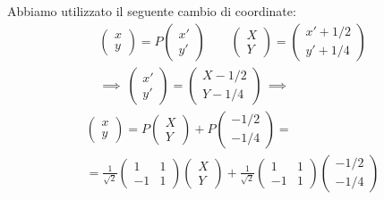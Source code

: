 
Abbiamo utilizzato il seguente cambio di coordinate: %
\begin{gather*}
    \begin{pmatrix}
        x\\y
    \end{pmatrix}=P\begin{pmatrix}
        x'\\y'
    \end{pmatrix}\qquad \begin{pmatrix}
        X\\Y
    \end{pmatrix}=\begin{pmatrix}
        x'+1/2\\ y'+1/4
    \end{pmatrix}\\
    \implies\:\begin{pmatrix}
        x'\\y'
    \end{pmatrix}=\begin{pmatrix}
        X-1/2\\ Y-1/4
    \end{pmatrix} \,\implies
\end{gather*}
\begin{multline*}
    \begin{pmatrix}
        x\\y
    \end{pmatrix}= P \begin{pmatrix}
        X\\Y
    \end{pmatrix}+ P\begin{pmatrix}
        -1/2\\ -1/4
    \end{pmatrix}=\\=\frac{1}{\sqrt{2}}\begin{pmatrix}
        1 & 1\\-1 & 1
    \end{pmatrix}\begin{pmatrix}
        X\\Y
    \end{pmatrix}+\frac{1}{\sqrt{2}}\begin{pmatrix}
        1 & 1\\-1 & 1
    \end{pmatrix}\begin{pmatrix}
        -1/2\\ -1/4
    \end{pmatrix}
\end{multline*}
